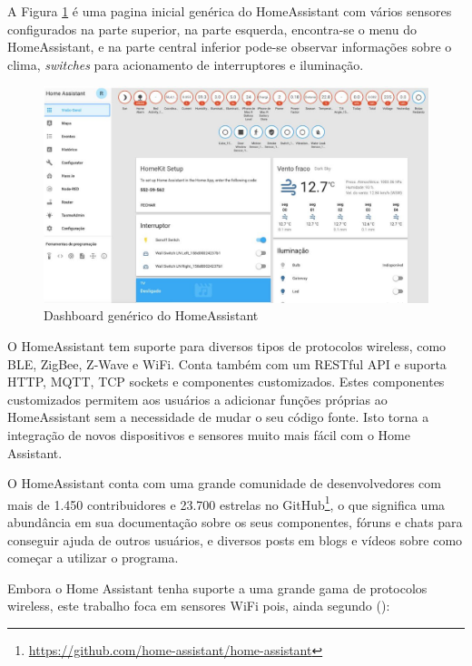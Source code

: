 A Figura \ref{fig:homeassistant-dash} é uma pagina inicial genérica do HomeAssistant com vários sensores configurados na parte superior, na parte esquerda, encontra-se o menu do HomeAssistant, e na parte central inferior pode-se observar informações sobre o clima, \textit{switches} para acionamento de interruptores e iluminação.

\begin{figure}[htbp]
	\centering
	\includegraphics[width=1\linewidth]{figuras/homeassistant-dash.png}
	\caption{Dashboard genérico do HomeAssistant}
	\label{fig:homeassistant-dash}
\end{figure}

O HomeAssistant tem suporte para diversos tipos de protocolos wireless, como BLE, ZigBee, Z-Wave e WiFi. Conta também com um RESTful API e suporta HTTP, MQTT, TCP sockets e componentes customizados. Estes componentes customizados permitem aos usuários a adicionar funções próprias ao HomeAssistant sem a necessidade de mudar o seu código fonte. Isto torna a integração de novos dispositivos e sensores muito mais fácil com o Home Assistant. \cite{Gomes2018}


O HomeAssistant conta com uma grande comunidade de desenvolvedores com mais de 1.450 contribuidores e 23.700 estrelas no GitHub\footnote{\url{https://github.com/home-assistant/home-assistant}}, o que significa uma abundância em sua documentação sobre os seus componentes, fóruns e chats para conseguir ajuda de outros usuários, e diversos posts em blogs e vídeos sobre como começar a utilizar o programa.

Embora o Home Assistant tenha suporte a uma grande gama de protocolos wireless, este trabalho foca em sensores WiFi pois, ainda segundo \citeauthor{Lundrigan2017} (\citeyear{Lundrigan2017}):

